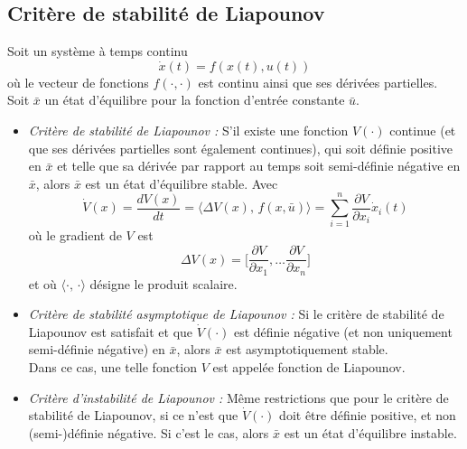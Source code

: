 \documentclass[a4paper]{article}
\begin{document}
\subsection{Critère de stabilité de Liapounov}
Soit un système à temps continu
\[\dot x(t)=f(x(t),u(t))\]
où le vecteur de fonctions $f(\cdot, \cdot)$ est continu ainsi que ses
dérivées partielles.\\
Soit $\bar x$ un état d'équilibre pour la fonction d'entrée constante $\bar u$.
\begin{itemize}
	\item \emph{Critère de stabilité de Liapounov :} S'il existe une fonction
		$V(\cdot)$ continue (et que ses dérivées partielles sont également
		continues), qui soit définie positive en $\bar x$ et telle que sa
		dérivée par rapport au temps soit semi-définie négative en $\bar x$,
		alors $\bar x$ est un état d'équilibre stable.
		Avec
		\[
			\dot V(x)=\frac{dV(x)}{dt}
			=\langle\Delta V(x),\,f(x,\bar u)\rangle
			=\sum_{i=1}^{n}\frac{\partial V}{\partial x_i}\dot x_i(t)\]
		où le gradient de \(V\) est
		\[\Delta V(x)=\big[\frac{\partial V}{\partial x_1},\dots
		\frac{\partial V}{\partial x_n}\big]\]
		et où \(\langle\cdot,\,\cdot\rangle\) désigne le produit scalaire.
	\item \emph{Critère de stabilité asymptotique de Liapounov :}
		Si le critère de stabilité de Liapounov est satisfait et que
		$\dot V(\cdot)$ est définie négative (et non uniquement semi-définie
		négative) en $\bar x$, alors $\bar x$ est asymptotiquement stable.\\
		Dans ce cas, une telle fonction \(V\) est appelée fonction de Liapounov.
	\item \emph{Critère d'instabilité de Liapounov :} Même restrictions
		que pour le critère de stabilité de Liapounov, si ce n'est que
		$\dot V(\cdot)$ doit être définie positive, et non
		(semi-)définie négative. Si c'est le cas, alors \(\bar x\) est
		un état d'équilibre instable.
\end{itemize}
\end{document}
